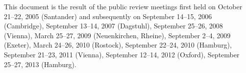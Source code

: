 This document is the result of the public review meetings first held on
October 21--22, 2005 (Santander) and subsequently on
September 14--15, 2006 (Cambridge),
September 13--14, 2007 (Dagstuhl),
September 25--26, 2008 (Vienna),
March 25--27, 2009 (Neuenkirchen, Rheine),
September 2--4, 2009 (Exeter),
March 24--26, 2010 (Rostock),
September 22--24, 2010 (Hamburg),
September 21--23, 2011 (Vienna),
September 12--14, 2012 (Oxford),
September 25--27, 2013 (Ham\-burg).
